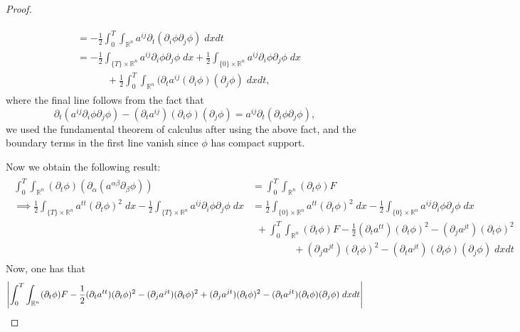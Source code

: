 \documentclass{article}
\numberwithin{equation}{section}
\begin{document}
\begin{proof}
\begin{enumerate}[itemsep =-2pt,label = (\arabic{*})]
\begin{align*}
\begin{split}
					&= -\frac{1}{2}\int_{0}^{T}\int_{\mathbb{R}^{n}}a^{ij}\partial_{t}(\partial_{i}\phi\partial_{j}\phi)\;dxdt  \\
					&= -\frac{1}{2}\int_{\{T\} \times \mathbb{R}^{n}}a^{ij}\partial_{i}\phi \partial_{j}\phi\;dx + \frac{1}{2}\int_{\{0\} \times \mathbb{R}^{n}}a^{ij}\partial_{i}\phi\partial_{j}\phi \;dx  \\ &\qquad\quad + \frac{1}{2}\int_{0}^{T}\int_{\mathbb{R}^n}(\partial_{t}a^{ij}(\partial_{i}\phi)(\partial_{j}\phi)\;dxdt, 
				\end{split}
			\end{align*}
			where the final line follows from the fact that 
			\begin{equation*}
				\partial_{t}(a^{ij}\partial_{i}\phi\partial_{j}\phi) - (\partial_{t}a^{ij})(\partial_{i}\phi)(\partial_{j}\phi) = a^{ij}\partial_{t}(\partial_{i}\phi\partial_{j}\phi), 
			\end{equation*}
			we used the fundamental theorem of calculus after using the above fact, and the boundary terms in the first line vanish since $\phi$ has compact support. 
		\end{enumerate}
		Now we obtain the following result: 
		\begin{align*}
			\begin{split}
				\int_{0}^{T}\int_{\mathbb{R}^{n}}(\partial_{t}\phi)(\partial_{\alpha}(a^{\alpha\beta}\partial_{\beta}\phi)) &= \int_{0}^{T}\int_{\mathbb{R}^{n}}(\partial_{t}\phi)F \\
				\implies 
				\frac{1}{2}\int_{\{T\} \times \mathbb{R}^{n}}a^{tt}(\partial_{t}\phi)^{2}\;dx -\frac{1}{2}\int_{\{T\}\times \mathbb{R}^{n}}a^{ij}\partial_{i}\phi\partial_{j}\phi\;dx &= \frac{1}{2}\int_{\{0\} \times \mathbb{R}^{n}}a^{tt}(\partial_{t}\phi)^{2}\;dx  -\frac{1}{2}\int_{\{0\} \times \mathbb{R}^{n}}a^{ij}\partial_{i}\phi\partial_{j}\phi\;dx \\
				&\hspace{5pt}+\int_{0}^{T}\int_{\mathbb{R}^{n}}(\partial_{t}\phi)F - \frac{1}{2}(\partial_{t}a^{tt})(\partial_{t}\phi)^{2} - (\partial_{j}a^{jt})(\partial_{t}\phi)^{2} \\
				&\qquad\qquad\hspace{2pt}+(\partial_{j}a^{jt})(\partial_{t}\phi)^{2} - (\partial_{t}a^{jt})(\partial_{t}\phi)(\partial_{j}\phi)\;dxdt
			\end{split}
		\end{align*}
		Now, one has that 
		\begin{multline*}
			\abs{\int_{0}^{T}\int_{\mathbb{R}^{n}}(\partial_{t}\phi)F - \frac{1}{2}(\partial_{t}a^{tt})(\partial_{t}\phi)^{2} - (\partial_{j}a^{jt})(\partial_{t}\phi)^{2}+(\partial_{j}a^{jt})(\partial_{t}\phi)^{2} - (\partial_{t}a^{jt})(\partial_{t}\phi)(\partial_{j}\phi)\;dxdt} \\

\end{multline*}
\end{proof}
\end{document}
